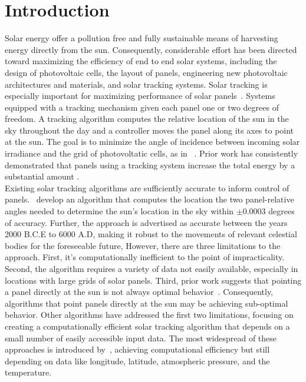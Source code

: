 \documentclass[11pt]{article}
\begin{document}
\section{Introduction}
Solar energy offer a pollution free and fully sustainable means of harvesting energy directly from the sun. Consequently, considerable effort has been directed toward maximizing the efficiency of end to end solar systems, including the design of photovoltaic cells, the layout of panels, engineering new photovoltaic architectures and materials, and solar tracking systems. Solar tracking is especially important for maximizing performance of solar panels~\cite{Eke2012,Rizk2008,King2001}. Systems equipped with a tracking mechanism given each panel one or two degrees of freedom. A tracking algorithm computes the relative location of the sun in the sky throughout the day and a controller moves the panel along its axes to point at the sun. The goal is to minimize the angle of incidence between incoming solar irradiance and the grid of photovoltatic cells, as in ~\citet{Eke2012,Benghanem2011,King2001, kalogirou1996design}. Prior work has consistently demonstrated that panels using a tracking system increase the total energy by a substantial amount . \\

Existing solar tracking algorithms are sufficiently accurate to inform control of panels.~\citet{reda2004solar} develop an algorithm that computes the location the two panel-relative angles needed to determine the sun's location in the sky within $\pm 0.0003$ degrees of accuracy. Further, the approach is advertised as accurate between the years 2000 B.C.E to 6000 A.D, making it robust to the movements of relevant celestial bodies for the foreseeable future, However, there are three limitations to the approach. First, it's computationally inefficient to the point of impracticality. Second, the algorithm requires a variety of data not easily available, especially in locations with large grids of solar panels. Third, prior work suggests that pointing a panel directly at the sun is not always optimal behavior~\citet{Kelly2009,Hussein1995,King2001}. Consequently, algorithms that point panels directly at the sun may be achieving sub-optimal behavior. Other algorithms have addressed the first two limitations, focusing on creating a computationally efficient solar tracking algorithm that depends on a small number of easily accessible input data. The most widespread of these approaches is introduced by~\citet{Grena2008}, achieving computational efficiency but still depending on data like longitude, latitude, atmospheric pressure, and the temperature. \\ 
\end{document}
